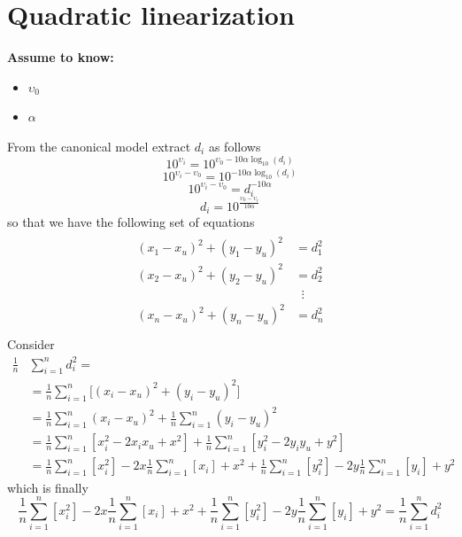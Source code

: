 \documentclass[12pt]{report}
\begin{document}
\section{Quadratic linearization}
  \begin{center}
  \textbf{Assume to know:}
  \begin{itemize}
    \centering
    \item $\upsilon_0$
    \item $\alpha$
  \end{itemize}
  \end{center}
From the canonical model extract $d_i$ as follows
\begin{equation*}
    10^{\upsilon_{i}}=10^{\upsilon_0-10\alpha\log_{10}(d_i)}
\end{equation*}
\begin{equation*}
    10^{\upsilon_{i}-\upsilon_0}=10^{-10\alpha\log_{10}(d_i)}
\end{equation*}
\begin{equation*}
     10^{\upsilon_{i}-\upsilon_0}=d_i^{-10\alpha}
\end{equation*}
\begin{equation}
    d_i=10^{\frac{\upsilon_0-\upsilon_{i}}{10\alpha}}
    \label{eq:17}
\end{equation}
so that we have the following set of equations
\begin{align}
\begin{split} 
(x_1-x_u)^2+(y_1-y_u)^2&=d_1^2 \\ 
(x_2-x_u)^2+(y_2-y_u)^2&=d_2^2 \\ 
&\;\;\vdots\\
(x_n-x_u)^2+(y_n-y_u)^2&=d_n^2 \\
\end{split}
\label{eq:11}
\end{align}
Consider 
\begin{align}
\frac{1}{n}&\sum_{i=1}^nd_i^2=\\
&=\frac{1}{n}\sum_{i=1}^n\big[(x_i-x_u)^2+(y_i-y_u)^2\big]\\
&=\frac{1}{n}\sum_{i=1}^n(x_i-x_u)^2+\frac{1}{n}\sum_{i=1}^n(y_i-y_u)^2\\
&=\frac{1}{n}\sum_{i=1}^n[x_i^2-2x_ix_u+x^2] + \frac{1}{n}\sum_{i=1}^n[y_i^2-2y_iy_u+y^2]\\
&=\frac{1}{n}\sum_{i=1}^n[x_i^2]-2x\frac{1}{n}\sum_{i=1}^n[x_i]+ x^2 + \frac{1}{n}\sum_{i=1}^n[y_i^2]-2y\frac{1}{n}\sum_{i=1}^n[y_i]+ y^2
\end{align}
which is finally
\begin{equation}
    \frac{1}{n}\sum_{i=1}^n[x_i^2]-2x\frac{1}{n}\sum_{i=1}^n[x_i]+ x^2 + \frac{1}{n}\sum_{i=1}^n[y_i^2]-2y\frac{1}{n}\sum_{i=1}^n[y_i]+ y^2= \frac{1}{n}\sum_{i=1}^nd_i^2
    \label{eq:12}
\end{equation}
\end{document}
